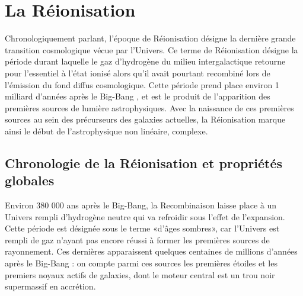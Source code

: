 \chapter{La Réionisation}

Chronologiquement parlant, l'époque de Réionisation désigne la dernière grande transition cosmologique vécue par l'Univers. Ce terme de Réionisation désigne la période durant laquelle le gaz d'hydrogène du milieu intergalactique retourne pour l'essentiel à l'état ionisé alors qu'il avait pourtant recombiné lors de l'émission du fond diffus cosmologique. Cette période prend place environ 1 milliard d'années après le Big-Bang , et est le produit de l'apparition des premières sources de lumière astrophysiques. Avec la naissance de ces premières sources au sein des précurseurs des galaxies actuelles, la Réionisation marque ainsi le début de l'astrophysique non linéaire, complexe.

\section{Chronologie de la Réionisation et propriétés globales}
Environ 380 000 ans après le Big-Bang, la Recombinaison laisse place à un Univers rempli d'hydrogène neutre qui va refroidir sous l'effet de l'expansion. Cette période est désignée sous le terme «d'âges sombres», car l'Univers est rempli de gaz n'ayant pas encore réussi à former les premières sources de rayonnement. Ces dernières apparaissent quelques centaines de millions d'années après le Big-Bang : on compte parmi ces sources les premières étoiles et les premiers noyaux actifs de galaxies, dont le moteur central est un trou noir supermassif en accrétion.

